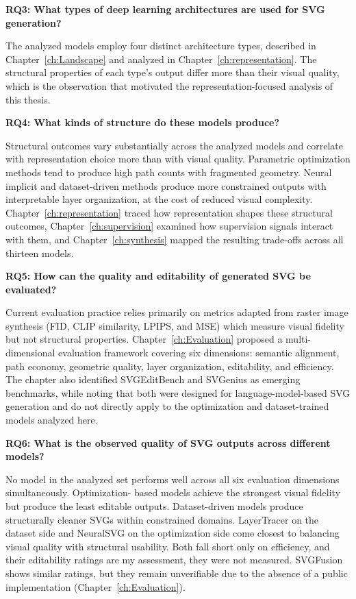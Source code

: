 \textbf{RQ3: What types of deep learning architectures 
are used for SVG generation?}

The analyzed models employ four distinct architecture 
types, described in Chapter~\ref{ch:Landscape} and 
analyzed in Chapter~\ref{ch:representation}. The 
structural properties of each type's output differ 
more than their visual quality, which is the 
observation that motivated the representation-focused 
analysis of this thesis.

\textbf{RQ4: What kinds of structure do these models 
produce?}

Structural outcomes vary substantially across the 
analyzed models and correlate with representation 
choice more than with visual quality. Parametric 
optimization methods tend to produce high path counts 
with fragmented geometry. Neural implicit and 
dataset-driven methods produce more constrained outputs 
with interpretable layer organization, at the cost of 
reduced visual complexity. Chapter~\ref{ch:representation} 
traced how representation shapes these structural outcomes,
Chapter~\ref{ch:supervision} examined how supervision signals interact with them, 
and Chapter~\ref{ch:synthesis} mapped the resulting trade-offs 
across all thirteen models.

\textbf{RQ5: How can the quality and editability of 
generated SVG be evaluated?}

Current evaluation practice relies primarily on metrics 
adapted from raster image synthesis (FID, CLIP 
similarity, LPIPS, and MSE) which measure visual 
fidelity but not structural properties. 
Chapter~\ref{ch:Evaluation} proposed a multi-dimensional 
evaluation framework covering six dimensions: semantic 
alignment, path economy, geometric quality, layer 
organization, editability, and efficiency. The chapter 
also identified SVGEditBench and SVGenius as emerging 
benchmarks, while noting that both were designed for 
language-model-based SVG generation and do not 
directly apply to the optimization and dataset-trained 
models analyzed here.

\textbf{RQ6: What is the observed quality of SVG 
outputs across different models?}

No model in the analyzed set performs well across all 
six evaluation dimensions simultaneously. Optimization-
based models achieve the strongest visual fidelity but 
produce the least editable outputs. Dataset-driven 
models produce structurally cleaner SVGs within 
constrained domains. LayerTracer on the dataset side and 
NeuralSVG on the optimization side come closest to balancing 
visual quality with structural usability. Both fall short 
only on efficiency, and their editability ratings are 
my assessment, they were not measured. SVGFusion shows similar 
ratings, but they remain unverifiable due to the absence 
of a public implementation (Chapter~\ref{ch:Evaluation}).


